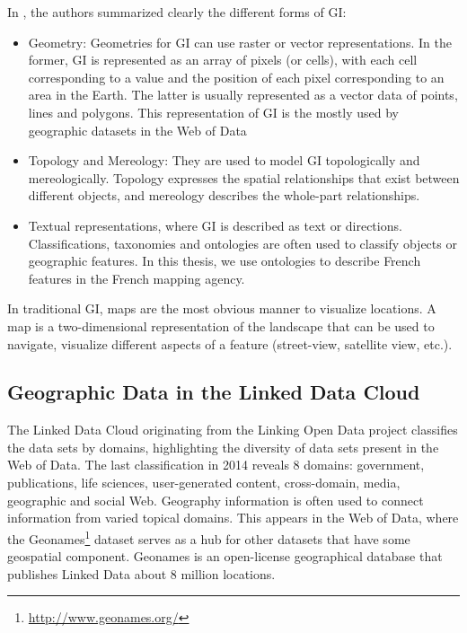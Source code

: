In \cite{ldgeob2013}, the authors summarized clearly the different forms of GI:
\begin{itemize}
 \item Geometry: Geometries for GI can use raster or vector representations. In the former, GI is represented as an array of pixels  (or cells), with each cell corresponding to a value and the position of each pixel corresponding to an area in the Earth. The latter is usually represented as a vector data of points, lines and polygons. This representation of GI is the mostly used by geographic datasets in the Web of Data
 \item Topology and Mereology: They are used to model GI topologically and mereologically. Topology expresses the spatial relationships that exist between different objects, and mereology describes the whole-part relationships.
 \item Textual representations, where GI is described as text or directions. Classifications, taxonomies and ontologies are often used to classify objects or geographic features. In this thesis, we use ontologies to describe French features in the French mapping agency.
\end{itemize}
	
In traditional GI, maps are the most obvious manner to visualize locations. A map is a two-dimensional representation of the landscape that can be used to navigate, visualize different aspects of a feature (street-view, satellite view, etc.).

\subsection{Geographic Data in the Linked Data Cloud}
\label{sec:geoldcloud}
The Linked Data Cloud originating from the Linking Open Data project classifies the data sets by domains, highlighting the diversity of data sets present in the Web of Data. The last classification in 2014 reveals 8 domains: government, publications, life sciences, user-generated content, cross-domain, media, geographic and social Web. Geography information is often used to connect information from varied topical domains. This appears in the Web of Data, where the Geonames\footnote{\url{http://www.geonames.org/}} dataset serves as a hub for other datasets that have some geospatial component. Geonames is an open-license geographical database that publishes Linked Data about 8 million locations.

